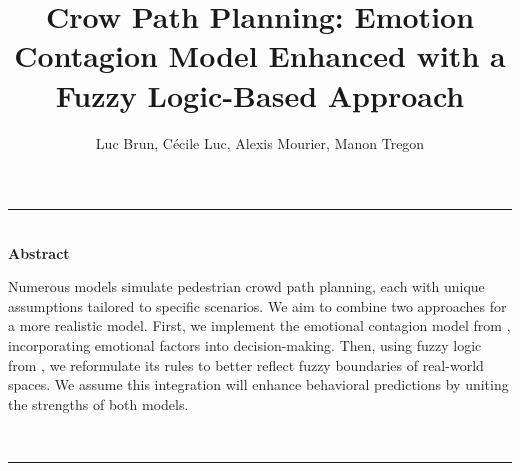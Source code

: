 \documentclass[12pt]{article}
\title{\vspace{-0.5cm} \fontsize{19}{20}\selectfont \textbf{Crow Path Planning: Emotion Contagion Model Enhanced with a Fuzzy Logic-Based Approach}}
\author{
     Luc Brun, Cécile Luc, Alexis Mourier, Manon Tregon
}
\date{}
\makeatletter
\renewcommand{\maketitle}{
    \begin{center}
        {\Large \bfseries \@title \par}
        \vskip 0.5cm %
        {\@author \par}
    \end{center}
}
\makeatother
\begin{document}
\maketitle
\begin{center}
    \rule{\textwidth}{0.5pt} \\[0.3cm]
    \textbf{Abstract} \\[0.3cm]
    \begin{minipage}{0.85\textwidth}
        \small
Numerous models simulate pedestrian crowd path planning, each with unique assumptions tailored to specific scenarios. We aim to combine two approaches for a more realistic model. First, we implement the emotional contagion model from \cite{emotionContagion}, incorporating emotional factors into decision-making. Then, using fuzzy logic from \cite{fuzzylogic}, we reformulate its rules to better reflect fuzzy boundaries of real-world spaces. We assume this integration will enhance behavioral predictions by uniting the strengths of both models.
    \end{minipage}
    \\[0.4cm]
    \rule{\textwidth}{0.5pt}
\end{center}
\end{document}
